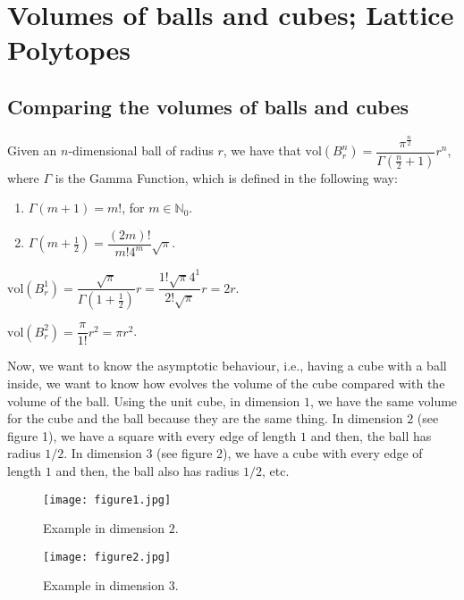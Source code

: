 \chapter{Volumes of balls and cubes; Lattice Polytopes}


\section{Comparing the volumes of balls and cubes}

Given an $n$-dimensional ball of radius $r$, we have that
$\text{vol}(B^{n}_{r}) = \dfrac{\pi^{\frac{n}{2}}}{\Gamma(\frac{n}{2}
  + 1)}r^{n}$, where $\Gamma$ is the Gamma Function, which is defined
in the following way:

\begin{enumerate}

\item $\Gamma(m + 1) = m !$, for $m \in \mathbb{N}_{0}$.

\item $\Gamma(m + \frac{1}{2}) = \dfrac{(2m)!}{m! 4^{m}}\sqrt{\pi}$.
\end{enumerate}

\begin{example} $\text{vol}(B^{1}_{r}) = \dfrac{\sqrt{\pi}}{\Gamma(1 + \frac{1}{2})}r = \dfrac{1!\sqrt{\pi}4^{1}}{2!\sqrt{\pi}}r = 2r$.
\end{example}
\begin{example} $\text{vol}(B^{2}_{r}) = \dfrac{\pi}{1!}r^{2} = \pi r^{2}$.
\end{example}

Now, we want to know the asymptotic behaviour, i.e., having a cube
with a ball inside, we want to know how evolves the volume of the cube
compared with the volume of the ball. Using the unit cube, in
dimension $1$, we have the same volume for the cube and the ball
because they are the same thing. In dimension $2$ (see figure 1), we
have a square with every edge of length $1$ and then, the ball has
radius $1/2$. In dimension $3$ (see figure 2), we have a cube with
every edge of length $1$ and then, the ball also has radius $1/2$,
etc.

\begin{figure}
\centering
\texttt{[image: figure1.jpg]}
\caption{Example in dimension $2$.}
\end{figure}

\begin{figure}
\centering
\texttt{[image: figure2.jpg]}
\caption{Example in dimension $3$.}
\end{figure}

